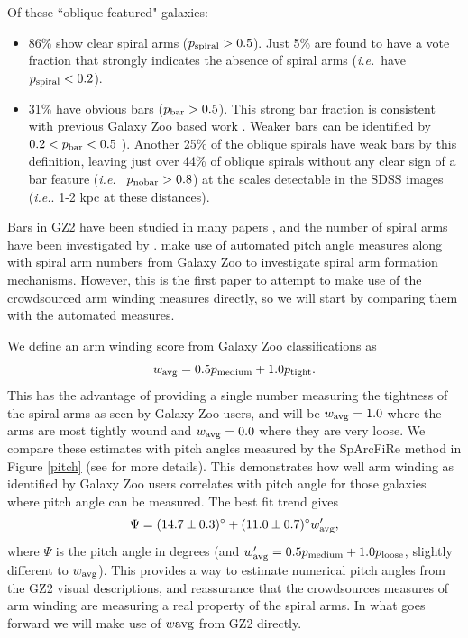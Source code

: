 \documentclass[usenatbib]{mn2e}
\newcommand{\ie}{{\it i.e.}}
\newcommand{\be}{\begin{equation}}
\newcommand{\ee}{\end{equation}}
\begin{document}
 Of these ``oblique featured" galaxies: 
\begin{itemize}
\item {86}\% show clear spiral arms ($p_{\rm spiral} > 0.5$). Just {5\%} are found to have a vote fraction that strongly indicates the absence of spiral arms (\ie ~have $p_{\rm spiral}<0.2$). 
\item {31}\% have obvious bars ($p_{\rm bar}>0.5$). This strong bar fraction is consistent with previous Galaxy Zoo based work \citep[e.g.][]{Masters2011, Masters2012}. Weaker bars can be identified by $0.2<p_{\rm bar}<0.5$ \citep[e.g.][]{Skibba2012,Willett2013,Kruk2018}). Another {25}\% of the oblique spirals have weak bars by this definition, leaving just over {44\%} of oblique spirals without any clear sign of a bar feature (\ie~ $p_{\rm no bar}>0.8$) at the scales detectable in the SDSS images (\ie. 1-2 kpc at these distances). 
\end{itemize}

Bars in GZ2 have been studied in many papers \citep[e.g.][]{Masters2011, Masters2012, Skibba2012, Cheung2013, Cheung2015, Galloway2015, Kruk2017, Kruk2018}, and the number of spiral arms have been investigated by \citep{Willett2015, Hart2016, Hart2017}. \citet{Hart2017b,Hart2018} make use of automated pitch angle measures along with spiral arm numbers from Galaxy Zoo to investigate spiral arm formation mechanisms. However, this is the first paper to attempt to make use of the crowdsourced arm winding measures directly, so we will start by comparing them with the automated measures. 

We define an arm winding score from Galaxy Zoo classifications as
\be
\label{eqn:winding}
w_{\rm avg} =  0.5p_{\rm medium} + 1.0p_{\rm tight}.
\ee
This has the advantage of providing a single number measuring the tightness of the spiral arms as seen by Galaxy Zoo users, and will be $w_{\rm avg} = 1.0$ where the arms are most tightly wound and $w_{\rm avg} = 0.0$ where they are very loose. We compare these estimates with pitch angles measured by the SpArcFiRe method \citep{DavisHayes2014} in Figure \ref{pitch} (see \citealt{Hart2017b} for more details). This demonstrates how well arm winding as identified by Galaxy Zoo users correlates with pitch angle for those galaxies where pitch angle can be measured. The best fit trend gives 
\be
\label{eqn:pitch}
\Psi =  (14.7\pm0.3)^\circ + (11.0\pm0.7)^\circ w'_{\rm avg}, 
\ee
where $\Psi$ is the pitch angle in degrees (and $w'_{\rm avg} = 0.5p_{\rm medium} + 1.0p_{\rm loose}$, slightly different to $w_{\rm avg}$). This provides a way to estimate numerical pitch angles from the GZ2 visual descriptions, and reassurance that the crowdsources measures of arm winding are measuring a real property of the spiral arms. In what goes forward we will make use of $w{\rm avg}$ from GZ2 directly.  
\end{document}
